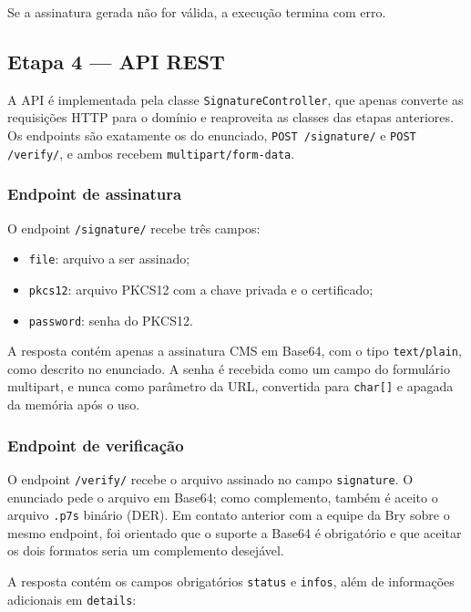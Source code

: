 \documentclass[12pt,a4paper]{article}
\begin{document}
Se a assinatura gerada não for válida, a execução termina com erro.

\subsection{Etapa 4 --- API REST}

A API é implementada pela classe \texttt{SignatureController}, que apenas converte as requisições HTTP para o domínio e reaproveita as classes das etapas anteriores. Os endpoints são exatamente os do enunciado, \texttt{POST /signature/} e \texttt{POST /verify/}, e ambos recebem \texttt{multipart/form-data}.

\subsubsection{Endpoint de assinatura}

O endpoint \texttt{/signature/} recebe três campos:

\begin{itemize}
    \item \texttt{file}: arquivo a ser assinado;
    \item \texttt{pkcs12}: arquivo PKCS12 com a chave privada e o certificado;
    \item \texttt{password}: senha do PKCS12.
\end{itemize}

A resposta contém apenas a assinatura CMS em Base64, com o tipo \texttt{text/plain}, como descrito no enunciado. A senha é recebida como um campo do formulário multipart, e nunca como parâmetro da URL, convertida para \texttt{char[]} e apagada da memória após o uso.

\subsubsection{Endpoint de verificação}

O endpoint \texttt{/verify/} recebe o arquivo assinado no campo \texttt{signature}. O enunciado pede o arquivo em Base64; como complemento, também é aceito o arquivo \texttt{.p7s} binário (DER). Em contato anterior com a equipe da Bry sobre o mesmo endpoint, foi orientado que o suporte a Base64 é obrigatório e que aceitar os dois formatos seria um complemento desejável.

A resposta contém os campos obrigatórios \texttt{status} e \texttt{infos}, além de informações adicionais em \texttt{details}:
\end{document}
